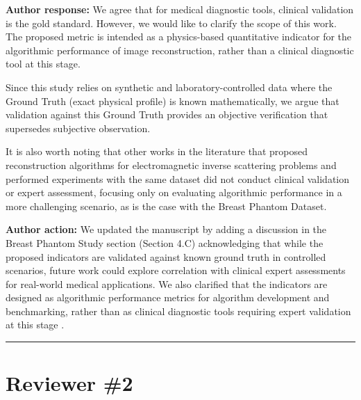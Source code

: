 \documentclass[12pt, a4paper]{article}
\newcommand{\reviewer}[1]{
    \vspace{1cm}
    \hrule
    \section*{Reviewer \##1}
}
\newcommand{\response}[1]{
    \noindent \textbf{Author response:} #1
    \par\vspace{0.3cm}
}
\newcommand{\action}[1]{
    \noindent \textbf{Author action:} #1
    \par\vspace{0.5cm}
}
\begin{document}
\response{We agree that for medical diagnostic tools, clinical validation is the gold standard. However, we would like to clarify the scope of this work. The proposed metric is intended as a physics-based quantitative indicator for the algorithmic performance of image reconstruction, rather than a clinical diagnostic tool at this stage.

Since this study relies on synthetic and laboratory-controlled data where the Ground Truth (exact physical profile) is known mathematically, we argue that validation against this Ground Truth provides an objective verification that supersedes subjective observation.

It is also worth noting that other works in the literature that proposed reconstruction algorithms for electromagnetic inverse scattering problems and performed experiments with the same dataset did not conduct clinical validation or expert assessment, focusing only on evaluating algorithmic performance in a more challenging scenario, as is the case with the Breast Phantom Dataset.}

\action{We updated the manuscript by adding a discussion in the Breast Phantom Study section (Section 4.C) acknowledging that while the proposed indicators are validated against known ground truth in controlled scenarios, future work could explore correlation with clinical expert assessments for real-world medical applications. We also clarified that the indicators are designed as algorithmic performance metrics for algorithm development and benchmarking, rather than as clinical diagnostic tools requiring expert validation at this stage \cite{contzano2023fast,wu2024physics,shah2018fast,batista2025eispy2d}.}

\reviewer{2}
\end{document}
